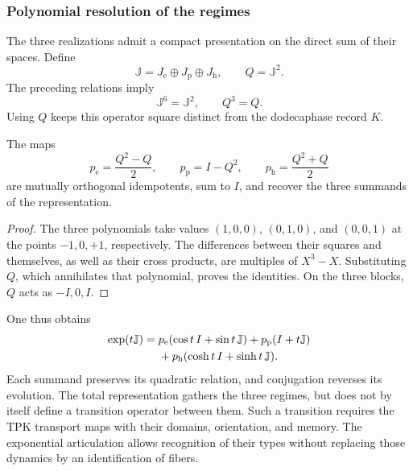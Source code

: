 \subsubsection{Polynomial resolution of the regimes}

The three realizations admit a compact presentation on the direct sum
of their spaces. Define
\[
 \mathbb J=J_{\mathrm e}\oplus J_{\mathrm p}\oplus J_{\mathrm h},
 \qquad Q=\mathbb J^2.
\]
The preceding relations imply
\[
 \mathbb J^6=\mathbb J^2,\qquad Q^3=Q.
\]
Using \(Q\) keeps this operator square distinct from the
dodecaphase record \(K\).

\begin{proposition}
\label{euler-trit-proyectores}
The maps
\[
 p_{\mathrm e}=\frac{Q^2-Q}{2},\qquad
 p_{\mathrm p}=I-Q^2,\qquad
 p_{\mathrm h}=\frac{Q^2+Q}{2}
\]
are mutually orthogonal idempotents, sum to \(I\), and recover
the three summands of the representation.
\end{proposition}
\begin{proof}
The three polynomials take values \((1,0,0)\), \((0,1,0)\), and
\((0,0,1)\) at the points \(-1,0,+1\), respectively. The differences
between their squares and themselves, as well as their cross products,
are multiples of \(X^3-X\). Substituting \(Q\), which annihilates
that polynomial, proves the identities. On the three blocks, \(Q\)
acts as \(-I,0,I\).
\end{proof}

One thus obtains
\begin{align}
 \exp(t\mathbb J)
 ={}&p_{\mathrm e}(\cos t\,I+\sin t\,\mathbb J)
   +p_{\mathrm p}(I+t\mathbb J)\notag\\
   &+p_{\mathrm h}(\cosh t\,I+\sinh t\,\mathbb J).
 \label{euler-trit-exponencial-total}
\end{align}
Each summand preserves its quadratic relation, and conjugation reverses
its evolution. The total representation gathers the three regimes, but
does not by itself define a transition operator between them. Such a
transition requires the TPK transport maps with their domains, orientation,
and memory. The exponential articulation allows recognition of their
types without replacing those dynamics by an identification of fibers.

